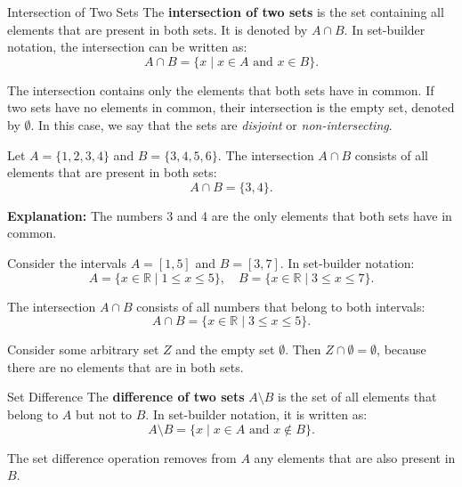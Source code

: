 \begin{definitionbox}{Intersection of Two Sets}  
    The \textbf{intersection of two sets} is the set containing all elements that are present in both sets. It is denoted by \( A \cap B \). In set-builder notation, the intersection can be written as:  
    \[
    A \cap B = \{x \mid x \in A \text{ and } x \in B\}.
    \]
    
    The intersection contains only the elements that both sets have in common. If two sets have no elements in common, their intersection is the empty set, denoted by \( \emptyset \). In this case, we say that the sets are \textit{disjoint} or \textit{non-intersecting}.
\end{definitionbox}    

\begin{example}
    Let \( A = \{1, 2, 3, 4\} \) and \( B = \{3, 4, 5, 6\} \). The intersection \( A \cap B \) consists of all elements that are present in both sets:  
    \[
    A \cap B = \{3, 4\}.
    \]
    
    \textbf{Explanation:} The numbers 3 and 4 are the only elements that both sets have in common.
\end{example}    

\begin{example}
    Consider the intervals \( A = \left[1, 5\right] \) and \( B = \left[3, 7\right] \). In set-builder notation:  
    \[
    A = \{x \in \mathbb{R} \mid 1 \leq x \leq 5\}, \quad B = \{x \in \mathbb{R} \mid 3 \leq x \leq 7\}.
    \]
    
    The intersection \( A \cap B \) consists of all numbers that belong to both intervals:  
    \[
    A \cap B = \{x \in \mathbb{R} \mid 3 \leq x \leq 5\}.
    \]
\end{example}

\begin{example}
    Consider some arbitrary set \(Z\) and the empty set \(\emptyset\). Then \(Z \cap \emptyset = \emptyset\), because there are no elements that are in both sets.
\end{example}

\begin{definitionbox}{Set Difference}  
    The \textbf{difference of two sets} \( A \setminus B \) is the set of all elements that belong to \( A \) but not to \( B \). In set-builder notation, it is written as:  
    \[
    A \setminus B = \{x \mid x \in A \text{ and } x \notin B\}.
    \]
    
    The set difference operation removes from \( A \) any elements that are also present in \( B \).
\end{definitionbox}


